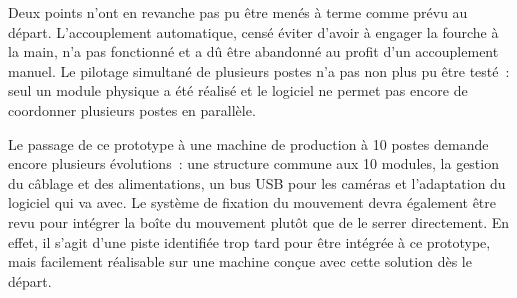 Deux points n'ont en revanche pas pu être menés à terme comme prévu au
départ. L'accouplement automatique, censé éviter d'avoir à engager la
fourche à la main, n'a pas fonctionné et a dû être abandonné au profit d'un
accouplement manuel. Le pilotage simultané de plusieurs postes n'a pas non
plus pu être testé~: seul un module physique a été réalisé et le logiciel
ne permet pas encore de coordonner plusieurs postes en parallèle.

Le passage de ce prototype à une machine de production à 10 postes demande
encore plusieurs évolutions~: une structure commune aux 10 modules, la
gestion du câblage et des alimentations, un bus USB pour les caméras et
l'adaptation du logiciel qui va avec. Le système de fixation du mouvement
devra également être revu pour intégrer la boîte du mouvement plutôt que de
le serrer directement. En effet, il s'agit d'une piste identifiée trop tard pour être intégrée à ce prototype, mais facilement réalisable sur une machine conçue avec cette
solution dès le départ.

\vfil
\hspace{8cm}\makeatletter\@author\makeatother\par
\hspace{8cm}\begin{minipage}{5cm}
    \printsignature
\end{minipage}


